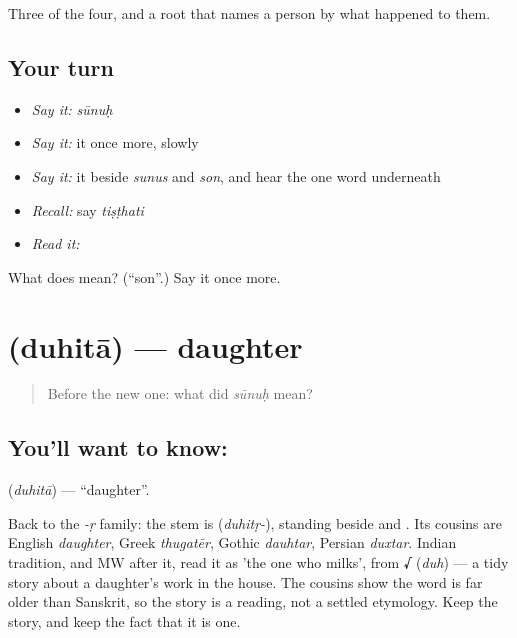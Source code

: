 \begin{grammarlens}[title={What you've built}]
Three of the four, and a root that names a person by what happened to them.
\end{grammarlens}

\subsection*{Your turn}
\begin{itemize}
\raggedright
  \item \emph{Say it:} \emph{sūnuḥ}
  \item \emph{Say it:} it once more, slowly
  \item \emph{Say it:} it beside \emph{sunus} and \emph{son}, and hear the one word underneath
  \item \emph{Recall:} say \emph{tiṣṭhati}
  \item \emph{Read it:} \textbf{}
\end{itemize}

\begin{tcolorbox}[breakable,colback=teal!4,colframe=teal!35!black,title={Before you move on}]
What does  mean? (\textquotedblleft{}son\textquotedblright{}.) Say it once more.
\end{tcolorbox}
\section[\texorpdfstring{\sk{दुहिता} (duhitā)}{दुहिता (duhitā)}]{ (duhitā) — daughter}

\label{lesson:SA-C23-daughter}



\begin{quote}
Before the new one: what did \emph{sūnuḥ} mean?
\end{quote}

\subsection*{You'll want to know: }
\textbf{} (\emph{duhitā}) — \textquotedblleft{}daughter\textquotedblright{}.

Back to the \emph{-ṛ} family: the stem is \textbf{} (\emph{duhitṛ-}), standing beside  and . Its cousins are English \emph{daughter}, Greek \emph{thugatēr}, Gothic \emph{dauhtar}, Persian \emph{duxtar}. Indian tradition, and MW after it, read it as 'the one who milks', from \textbf{√} (\emph{duh}) — a tidy story about a daughter's work in the house. The cousins show the word is far older than Sanskrit, so the story is a reading, not a settled etymology. Keep the story, and keep the fact that it is one.


